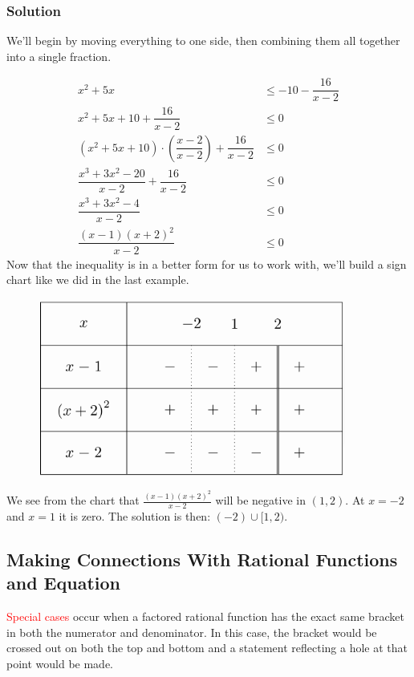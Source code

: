 \documentclass{article}
\begin{document}
\subsubsection*{Solution}
We’ll begin by moving everything to one side, then combining them all together into a single fraction.

\begin{align*} 
         x^2 + 5x &\leq -10 -\dfrac{16}{x-2}\\
      x^2 + 5x +10 +\dfrac{16}{x-2} &\leq 0\\
      \left(x^2+5x+10\right) \cdot \left(\dfrac{x-2}{x-2}\right) +\dfrac{16}{x-2} &\leq 0\\
      \dfrac{x^3+3x^2-20}{x-2} + \dfrac{16}{x-2} &\leq 0\\    
      \dfrac{x^3+3x^2-4}{x-2} &\leq 0\\
      \dfrac{(x-1)(x+2)^2}{x-2} &\leq 0
    \end{align*}
    Now that the inequality is in a better form for us to work with, we’ll build a sign chart like we did in the last example.

    \begin{figure}[ht]
    \centering
    \includegraphics[width=0.9\textwidth]{imgs/graph figure.png}
    \end{figure}
We see from the chart that $\displaystyle \frac{(x-1)(x+2)^2}{x-2}$ will be negative in $(1,2)$. At $x=-2$ and $x=1$ it is zero. The solution is then: $(-2) \cup [1,2)$.
\newpage
\subsection{Making Connections With Rational Functions and Equation}
\textcolor{red}{Special cases} occur when a factored rational function has the exact same bracket in both the numerator and denominator. In this case, the
bracket would be crossed out on both the top and bottom and a statement reflecting a hole at that point would be made.
\end{document}
